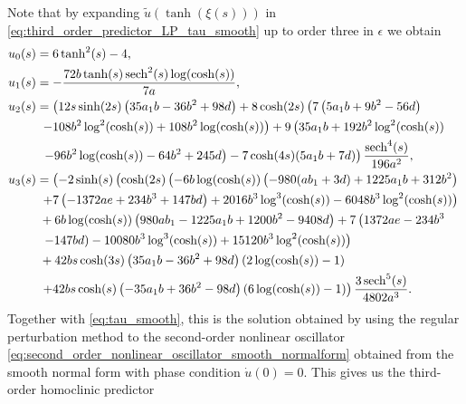 Note that by expanding $\tilde{u}\left(\tanh\left(\xi(s)\right)\right)$ in
\cref{eq:third_order_predictor_LP_tau_smooth} up to order three in $\epsilon$ 
we obtain
\begin{equation}
\label{eq:u_i_RP_smooth}
\begin{aligned}
    u_0(s) &= 6 \tanh ^2(s)-4, \\
    u_1(s) &= -\frac{72 b \tanh (s) \operatorname{sech}^2(s) \log (\cosh (s))}{7 a}, \\
    u_2(s) &= \left(12 s \sinh (2 s) \left(35 a_1 b-36 b^2+98 d\right)+8
        \cosh (2 s) \left(7 \left(5 a_1 b+9 b^2-56 d\right) \right. \right. \\
              & \; \left. -108 b^2 \log ^2(\cosh (s))+108 b^2 \log (\cosh (s))\right)
              +9 \left(35 a_1 b+192 b^2 \log^2(\cosh (s)) \right. \\
              & \; \left.\left. -96 b^2 \log (\cosh(s))-64 b^2+245 d\right)-7
              \cosh (4 s) (5 a_1 b+7 d)\right)\frac{\operatorname{sech}^4(s)}{196 a^2}, \\
        u_3(s) &=  \left(-2 \sinh (s) \left(\cosh (2 s) \left(-6 b \log (\cosh (s))
                        \left(-980 (a b_1+3 d)+1225 a_1 b+312 b^2\right)
                        \right.\right.\right. \\ 
                  & \; \left. +7 \left(-1372 a e+234 b^3+147 b d\right)+2016 b^3 \log^3(\cosh (s)) -6048 b^3 \log ^2(\cosh (s))\right)\\
                  & \; +6 b \log(\cosh(s)) \left(980 a b_1-1225 a_1 b+1200 b^2 -9408 d\right)+7 \left(1372 a e-234 b^3 \right. \\
                  & \; \left. \left. - 147 b d\right)-10080 b^3 \log ^3(\cosh (s)) +15120
                  b^3 \log ^2(\cosh (s))\right)  \\
                  & \; +42 b s \cosh ( 3 s)\left(35 a_1 b -36 b^2+98 d\right) (2 \log (\cosh (s)) -1) \\
                  & \; \left. +42 b s \cosh (s) \left(-35 a_1 b+36 b^2-98 d\right) (6 \log (\cosh (s))-1)\right)\frac{3 \operatorname{sech}^5(s)}{4802 a^3}.
\end{aligned}
\end{equation}
Together with \cref{eq:tau_smooth}, this is the solution obtained by using the
regular perturbation method to the second-order nonlinear oscillator
\cref{eq:second_order_nonlinear_oscillator_smooth_normalform} obtained from the
smooth normal form with phase condition $\dot u(0)=0$. This gives us the third-order
homoclinic predictor
